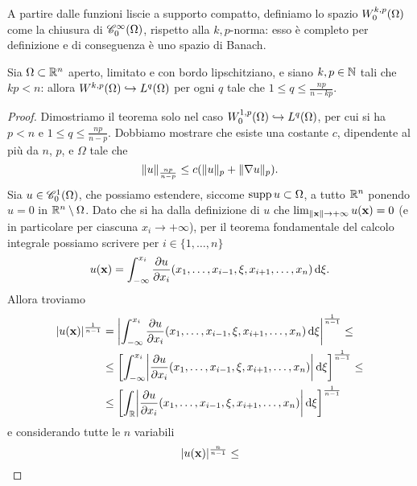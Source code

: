 A partire dalle funzioni liscie a supporto compatto, definiamo lo spazio $\sobWc[k,p]{\Omega}$ come la chiusura di $\contsc[\infty]{\Omega}$, rispetto alla $k,p$-norma: esso è completo per definizione e di conseguenza è uno spazio di Banach.
\begin{teorema}[Sobolev] \label{t:sobolev}
    Sia $\Omega\subset\R^n$ aperto, limitato e con bordo lipschitziano, e siano $k,p\in\N$ tali che $kp<n$: allora $\sobW[k,p]{\Omega}\emb\leb[q]{\Omega}$ per ogni $q$ tale che $1\le q\le\frac{np}{n-kp}$.
\end{teorema}
\begin{proof}
    Dimostriamo il teorema solo nel caso $\sobWc[1,p]{\Omega}\emb\leb[q]{\Omega}$, per cui si ha $p<n$ e $1\le q\le\frac{np}{n-p}$.
    Dobbiamo mostrare che esiste una costante $c$, dipendente al più da $n$, $p$, e $\Omega$ tale che
    \begin{equation}
        \norm{u}_\frac{np}{n-p}\le c(\norm{u}_p+\norm{\grad u}_p).
        \label{eq:dim-sobolev-obiettivo}
    \end{equation}
    Sia $u\in\contsc[1]{\Omega}$, che possiamo estendere, siccome $\supp u\subset\Omega$, a tutto $\R^n$ ponendo $u=0$ in $\R^n\setminus\Omega$.
    Dato che si ha dalla definizione di $u$ che $\lim_{\norm{\vec x}\to+\infty}u(\vec x)=0$ (e in particolare per ciascuna $x_i\to+\infty$), per il teorema fondamentale del calcolo integrale possiamo scrivere per $i\in\{1,\dotsc,n\}$
    \begin{equation}
        u(\vec x)=\int_{-\infty}^{x_i}\drp{u}{x_i}(x_1,\dotsc,x_{i-1},\xi,x_{i+1},\dotsc,x_n)\,\dd\xi.
    \end{equation}
    Allora troviamo
    \begin{equation}
        \begin{split}
            \abs{u(\vec x)}^\frac1{n-1}&=
            \abs[\bigg]{\int_{-\infty}^{x_i}\drp{u}{x_i}(x_1,\dotsc,x_{i-1},\xi,x_{i+1},\dotsc,x_n)\,\dd\xi}^\frac1{n-1}\le\\ &\le
            \biggl[\int_{-\infty}^{x_i}\abs[\bigg]{\drp{u}{x_i}(x_1,\dotsc,x_{i-1},\xi,x_{i+1},\dotsc,x_n)}\,\dd\xi\biggr]^\frac1{n-1}\le\\ &\le
            \biggl[\int_\R\abs[\bigg]{\drp{u}{x_i}(x_1,\dotsc,x_{i-1},\xi,x_{i+1},\dotsc,x_n)}\,\dd\xi\biggr]^\frac1{n-1}
        \end{split}
    \end{equation}
    e considerando tutte le $n$ variabili
    \begin{equation}
        \abs{u(\vec x)}^\frac{n}{n-1}\le

\end{equation}
\end{proof}
